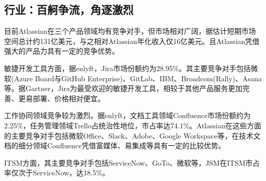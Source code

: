 \subsection{行业：百舸争流，角逐激烈}

目前Atlassian在三个产品领域均有竞争对手，但市场相对广阔，据估计短期市场空间总计约131亿美元，与之相对Atlassian年化收入仅16亿美元。且Atlassian凭借强大的产品力具有一定的竞争优势。

敏捷开发工具方面，据enlyft，Jira市场份额约为28.95\%。其主要竞争对手包括微软(Azure Board与GitHub Enterprise)、GitLab、IBM、Broadcom(Rally)、Asana等。据Gartner，Jira为最受欢迎的敏捷开发工具，相较于其他产品服务更加完善、更易部署、价格相对便宜。

工作协同领域竞争较为激烈。据enlyft，文档工具领域Confluence市场份额约为2.25\%，任务管理领域Trello占统治性地位，市占率达74.1\%。Atlassian在这些方面的主要竞争对手包括微软Office、Slack、Adobe、Google Workspace等，在技术文档的细分领域Confluence凭借富媒体、易集成等具有一定的比较优势。

ITSM方面，其主要竞争对手包括ServiceNow、GoTo、微软等，JSM在ITSM市占率仅次于ServiceNow，达18.5\%。
